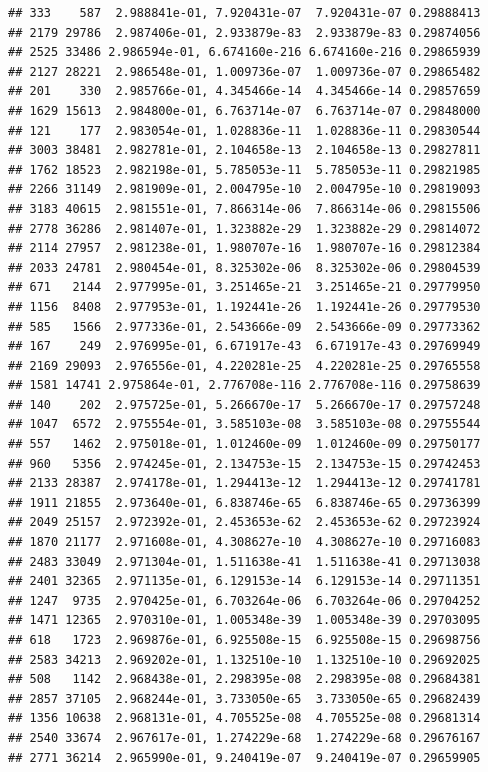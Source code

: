 \documentclass[
]{article}
\begin{document}
\begin{verbatim}
## 333    587  2.988841e-01, 7.920431e-07  7.920431e-07 0.29888413
## 2179 29786  2.987406e-01, 2.933879e-83  2.933879e-83 0.29874056
## 2525 33486 2.986594e-01, 6.674160e-216 6.674160e-216 0.29865939
## 2127 28221  2.986548e-01, 1.009736e-07  1.009736e-07 0.29865482
## 201    330  2.985766e-01, 4.345466e-14  4.345466e-14 0.29857659
## 1629 15613  2.984800e-01, 6.763714e-07  6.763714e-07 0.29848000
## 121    177  2.983054e-01, 1.028836e-11  1.028836e-11 0.29830544
## 3003 38481  2.982781e-01, 2.104658e-13  2.104658e-13 0.29827811
## 1762 18523  2.982198e-01, 5.785053e-11  5.785053e-11 0.29821985
## 2266 31149  2.981909e-01, 2.004795e-10  2.004795e-10 0.29819093
## 3183 40615  2.981551e-01, 7.866314e-06  7.866314e-06 0.29815506
## 2778 36286  2.981407e-01, 1.323882e-29  1.323882e-29 0.29814072
## 2114 27957  2.981238e-01, 1.980707e-16  1.980707e-16 0.29812384
## 2033 24781  2.980454e-01, 8.325302e-06  8.325302e-06 0.29804539
## 671   2144  2.977995e-01, 3.251465e-21  3.251465e-21 0.29779950
## 1156  8408  2.977953e-01, 1.192441e-26  1.192441e-26 0.29779530
## 585   1566  2.977336e-01, 2.543666e-09  2.543666e-09 0.29773362
## 167    249  2.976995e-01, 6.671917e-43  6.671917e-43 0.29769949
## 2169 29093  2.976556e-01, 4.220281e-25  4.220281e-25 0.29765558
## 1581 14741 2.975864e-01, 2.776708e-116 2.776708e-116 0.29758639
## 140    202  2.975725e-01, 5.266670e-17  5.266670e-17 0.29757248
## 1047  6572  2.975554e-01, 3.585103e-08  3.585103e-08 0.29755544
## 557   1462  2.975018e-01, 1.012460e-09  1.012460e-09 0.29750177
## 960   5356  2.974245e-01, 2.134753e-15  2.134753e-15 0.29742453
## 2133 28387  2.974178e-01, 1.294413e-12  1.294413e-12 0.29741781
## 1911 21855  2.973640e-01, 6.838746e-65  6.838746e-65 0.29736399
## 2049 25157  2.972392e-01, 2.453653e-62  2.453653e-62 0.29723924
## 1870 21177  2.971608e-01, 4.308627e-10  4.308627e-10 0.29716083
## 2483 33049  2.971304e-01, 1.511638e-41  1.511638e-41 0.29713038
## 2401 32365  2.971135e-01, 6.129153e-14  6.129153e-14 0.29711351
## 1247  9735  2.970425e-01, 6.703264e-06  6.703264e-06 0.29704252
## 1471 12365  2.970310e-01, 1.005348e-39  1.005348e-39 0.29703095
## 618   1723  2.969876e-01, 6.925508e-15  6.925508e-15 0.29698756
## 2583 34213  2.969202e-01, 1.132510e-10  1.132510e-10 0.29692025
## 508   1142  2.968438e-01, 2.298395e-08  2.298395e-08 0.29684381
## 2857 37105  2.968244e-01, 3.733050e-65  3.733050e-65 0.29682439
## 1356 10638  2.968131e-01, 4.705525e-08  4.705525e-08 0.29681314
## 2540 33674  2.967617e-01, 1.274229e-68  1.274229e-68 0.29676167
## 2771 36214  2.965990e-01, 9.240419e-07  9.240419e-07 0.29659905

\end{verbatim}
\end{document}
